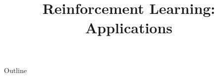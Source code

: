 \documentclass[xcolor=dvipsnames,compress,t,pdf,9pt]{beamer}
\title[\insertframenumber /\inserttotalframenumber]{Reinforcement Learning: Applications}
\begin{document}
	\begin{frame}
	\titlepage
	\end{frame}

	\begin{frame}{Outline}
	    \tableofcontents
	\end{frame}

	
	
	
\end{document}
